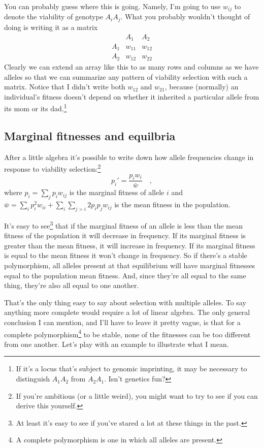 \documentclass[12pt]{article}
\begin{document}
\noindent You can probably guess where this is going. Namely, I'm
going to use $w_{ij}$ to denote the viability of genotype
$A_iA_j$. What you probably wouldn't thought of doing is writing it as
a matrix
\[
\begin{array}{ccc}
    & A_1  & A_2 \\
A_1 & w_{11} & w_{12} \\
A_2 & w_{12} & w_{22}
\end{array}
\]
Clearly we can extend an array like this to as many rows and columns
as we have alleles so that we can summarize any pattern of viability
selection with such a matrix. Notice that I didn't write both $w_{12}$
and $w_{21}$, because (normally) an individual's fitness doesn't
depend on whether it inherited a particular allele from its mom or its
dad.\footnote{If it's a locus that's subject to genomic imprinting, it
  may be necessary to distinguish $A_1A_2$ from $A_2A_1$. Isn't
  genetics fun?}

\subsection*{Marginal fitnesses and
  equilbria}

After a little algebra it's possible to write down how allele
frequencies change in response to viability selection:\footnote{If
  you're ambitious (or a little weird), you might want to try to see
  if you can derive this yourself.}
\[
p_i' = \frac{p_iw_i}{\bar w} \quad ,
\]
where $p_i = \sum_j p_i w_{ij}$ is the marginal fitness of allele $i$ and
$\bar w = \sum_i p_i^2 w_{ii} + \sum_i\sum_{j>i} 2p_ip_jw_{ij}$ is the
mean fitness in the population.

It's easy to see\footnote{At least it's easy to see if you've stared a
  lot at these things in the past.} that if the marginal fitness of an
allele is less than the mean fitness of the population it will
decrease in frequency. If its marginal fitness is greater than the
mean fitness, it will increase in frequency.  If its marginal fitness
is equal to the mean fitness it won't change in frequency. So if
there's a stable polymorphism, all alleles present at that equilibrium
will have marginal fitnesses equal to the population mean
fitness. And, since they're all equal to the same thing, they're also
all equal to one another.

That's the only thing easy to say about selection with multiple
alleles. To say anything more complete would require a lot of linear
algebra. The only general conclusion I can mention, and I'll have to
leave it pretty vague, is that for a complete polymorphism\footnote{A
complete polymorphism is one in which all alleles are present.} to be
stable, none of the fitnesses can be too different from one
another. Let's play with an example to illustrate what I mean.
\end{document}

